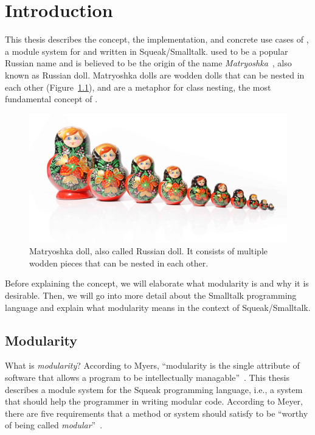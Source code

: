 \chapter{Introduction}
This thesis describes the concept, the implementation, and concrete use cases of \emph{\msname}, a module system for and written in Squeak/Smalltalk. \msname used to be a popular Russian name and is believed to be the origin of the name \emph{Matryoshka}~\cite{dixon1998encyclopedia}, also known as Russian doll. Matryoshka dolls are wodden dolls that can be nested in each other (Figure~\ref{fig:matryoshka}), and are a metaphor for class nesting, the most fundamental concept of \msname.

\begin{figure}[!htp]
	\includegraphics[width=\textwidth]{matr.jpg}
	\caption[Matryoshka doll]{Matryoshka doll\footnotemark, also called Russian doll. It consists of multiple wodden pieces that can be nested in each other.}
	\label{fig:matryoshka}
\end{figure}


Before explaining the concept, we will elaborate what modularity is and why it is desirable. Then, we will go into more detail about the Smalltalk programming language and explain what modularity means in the context of Squeak/Smalltalk.

\section{Modularity}
\label{sec:meyermod}
What is \emph{modularity}? According to Myers, ``modularity is the single attribute of software that allows a program to be intellectually managable''~\cite{myers1978composite}. This thesis describes a module system for the Squeak programming language, i.e., a system that should help the programmer in writing modular code. According to Meyer, there are five requirements that a method or system should satisfy to be ``worthy of being called \emph{modular}''~\cite{Meyer:1988:OSC:534929}.

